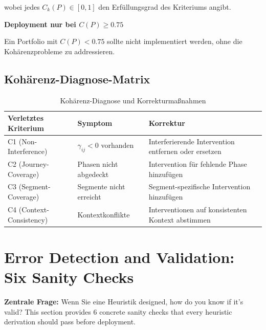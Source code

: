 wobei jedes $C_k(P) \in [0, 1]$ den Erfüllungsgrad des Kriteriums angibt.

\begin{tcolorbox}[colback=blue!5!white, colframe=blue!75!black,
    title=Deployment-Regel]
\textbf{Deployment nur bei $C(P) \geq 0.75$}

Ein Portfolio mit $C(P) < 0.75$ sollte nicht implementiert werden, ohne die Kohärenzprobleme zu addressieren.
\end{tcolorbox}

\subsection{Kohärenz-Diagnose-Matrix}

\begin{table}[htbp]
\centering
\caption{Kohärenz-Diagnose und Korrekturmaßnahmen}
\label{tab:20-coherence-diagnosis}
\renewcommand{\arraystretch}{1.3}
\small
\begin{tabular}{@{}lp{4cm}p{5cm}@{}}
\toprule
\textbf{Verletztes Kriterium} & \textbf{Symptom} & \textbf{Korrektur} \\
\midrule
C1 (Non-Interference) & $\gamma_{ij} < 0$ vorhanden & Interferierende Intervention entfernen oder ersetzen \\
C2 (Journey-Coverage) & Phasen nicht abgedeckt & Intervention für fehlende Phase hinzufügen \\
C3 (Segment-Coverage) & Segmente nicht erreicht & Segment-spezifische Intervention hinzufügen \\
C4 (Context-Consistency) & Kontextkonflikte & Interventionen auf konsistenten Kontext abstimmen \\
\bottomrule
\end{tabular}
\end{table}


\section{Error Detection and Validation: Six Sanity Checks}
\label{sec:20-validation}

\textbf{Zentrale Frage:} Wenn Sie eine Heuristik designed, how do you know if it's valid? This section provides 6 concrete sanity checks that every heuristic derivation should pass before deployment.

